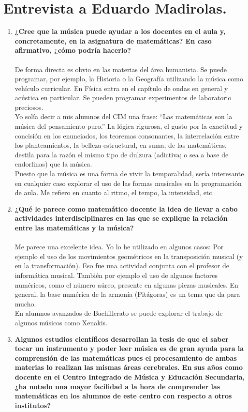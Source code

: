 \documentclass[a4paper, openright, 11pt, titlepage]{report}
\theoremstyle{definition}\newtheorem{defin}[propo]{Definition}
\theoremstyle{definition}\newtheorem{obser}[propo]{Remark}
\theoremstyle{definition}\newtheorem{ejem}[propo]{Ejemplo}
\theoremstyle{definition}\newtheorem{algoritmo}[propo]{Algoritmo}
\begin{document}
\section{Entrevista a Eduardo Madirolas.}
\begin{enumerate}
    \item \textbf{¿Cree que la música puede ayudar a los docentes en el aula y, concretamente, en la asignatura de matemáticas? En caso afirmativo, ¿cómo podría hacerlo?}\\\\
    De forma directa es obvio en las materias del área humanista. Se puede programar, por ejemplo, la Historia o la Geografía utilizando la música como vehículo curricular. En Física entra en el capítulo de ondas en general y acústica en particular. Se pueden programar experimentos de laboratorio preciosos.\\
    Yo solía decir a mis alumnos del CIM una frase: “Las matemáticas son la música del pensamiento puro.” La lógica rigurosa, el gusto por la exactitud y concisión en los enunciados, los teoremas consonantes, la interrelación entre los planteamientos, la belleza estructural, en suma, de las matemáticas, destila para la razón el mismo tipo de
    dulzura (adictiva; o sea a base de endorfinas) que la música.\\
    Puesto que la música es una forma de vivir la temporalidad, sería interesante en cualquier caso explorar el uso de las formas musicales en la programación de aula. Me refiero en cuanto al ritmo, el tempo, la intensidad, etc.
    \item \textbf{¿Qué le parece como matemático docente la idea de llevar a cabo actividades interdisciplinares en las que se explique la relación entre las matemáticas y la música?}\\\\
    Me parece una excelente idea. Yo lo he utilizado en algunos casos: Por ejemplo el uso de los movimientos geométricos en la transposición musical (y en la transformación). Eso fue una actividad conjunta con el profesor de informática musical. También por ejemplo el uso de algunos factores numéricos, como el número aúreo, presente en algunas piezas musicales. En general, la base numérica de la armonía (Pitágoras) es un tema que da para mucho. \\
    En alumnos avanzados de Bachillerato se puede explorar el trabajo de algunos músicos como Xenakis.
    \item \textbf{Algunos estudios científicos desarrollan la tesis de que el saber tocar un instrumento y poder leer música es de gran ayuda para la comprensión de las matemáticas pues el procesamiento de ambas materias lo realizan las mismas áreas cerebrales. En sus años como docente en el Centro Integrado de Música y Educación Secundaria, ¿ha notado una mayor facilidad a la hora de comprender las matemáticas en los alumnos de este centro con respecto a otros institutos?}\\\\

\end{enumerate}
\end{document}
